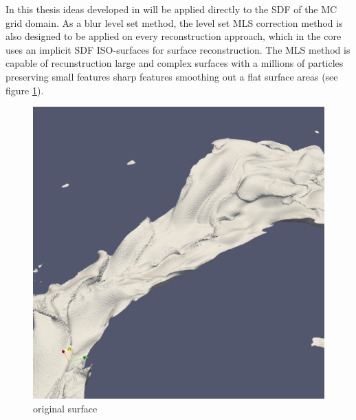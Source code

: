 In this thesis ideas developed in \cite{Apss} will be applied directly to the SDF of the MC grid domain. As a blur level set method, the level set MLS correction method is also designed to be applied on every reconstruction approach, which in the core uses an implicit SDF ISO-surfaces for surface reconstruction. The MLS method is capable of recunstruction large and complex surfaces with a millions of particles preserving small features sharp features smoothing out a flat surface areas (see figure \ref{fig:mls_motivation}).
\begin{figure}
	\begin{center}
			\includegraphics[width=\textwidth]{figures/CanionOriginal1.png}
	\end{center}
	\caption{original surface}
	\label{fig:mls_motivation}
\end{figure}
